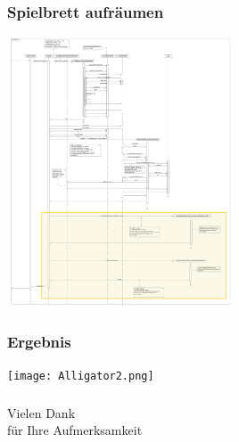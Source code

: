 \documentclass[t]{beamer}
\begin{document}
\begin{frame}
	\frametitle{Spielbrett aufräumen}
	\begin{center}
		\includegraphics[width=0.5\textwidth]{Beta-Reduction-withYellow.png}
	\end{center}
\end{frame}

\begin{frame}
	\frametitle{Ergebnis}
	\begin{center}
		\texttt{[image: Alligator2.png]}
	\end{center}
\end{frame}

\begin{frame}
	\frametitle{}
	\begin{center}
	\begin{Huge}
		Vielen Dank\\ für Ihre Aufmerksamkeit
	\end{Huge}
	\end{center}
\end{frame}

\end{document}
